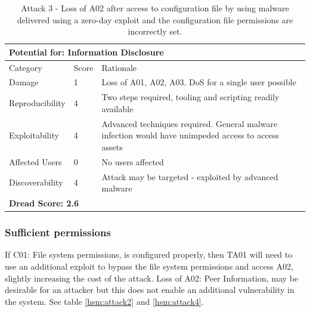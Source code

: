 \documentclass [11pt, proquest] {uwthesis}[2020/02/24]
\begin{document}
\begin{table}[H]
\begin{tabular}{|m{3cm}|m{.9cm}|p{27em} |}
\multicolumn{3}{l}{Potential for: Information Disclosure}  \\
\hline
Category & Score & Rationale \\
\hline
Damage          & 1     & Loss of A01, A02, A03. DoS for a single user possible \\
\hline
Reproducibility & 4     & Two steps required, tooling and scripting readily available    \\
\hline
Exploitability & 4      & Advanced techniques required. General malware infection would have unimpeded access to access assets  \\
\hline
Affected Users  & 0     & No users affected  \\
\hline
Discoverability & 4     & Attack may be targeted - exploited by advanced malware \\
\hline
\multicolumn{3}{l}{\textbf{Dread Score: 2.6}} 
\end{tabular}
\caption{Attack 3 - Loss of A02 after access to configuration file by using malware delivered using a zero-day exploit and the configuration file permissions are incorrectly set.}
\label{hsm:attack3}
\end{table}

\subsubsection{Sufficient permissions}
If C01: File system permissions, is configured properly, then TA01 will need to use an additional exploit to bypass the file system permissions and access A02, slightly increasing the cost of the attack. Loss of A02: Peer Information, may be desirable for an attacker but this does not enable an additional vulnerability in the system.
See table \ref{hsm:attack2} and \ref{hsm:attack4}.
\end{document}
